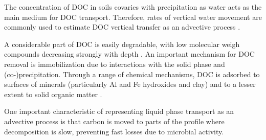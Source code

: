 \documentclass[11pt, oneside, a4paper]{article}   	%
\begin{document}
The concentration of DOC in soils covaries with precipitation \citep{Liu2021} as water acts as the main medium for DOC transport. Therefore, rates of vertical water movement are commonly used to estimate DOC vertical transfer as an advective process \citep{Ota2013}. 

A considerable part of DOC is easily degradable, with low molecular weigh compounds decreasing strongly with depth \citep{Roth2019}.  An important mechanism for DOC removal
is immobilization due to interactions with the solid phase and (co-)precipitation.
Through a range of chemical mechanisms, DOC is adsorbed to surfaces of minerals (particularly Al and Fe hydroxides and clay) and to a lesser extent to solid organic
matter \citep{Neff2001, Kalbitz2008}.

One important characteristic of representing liquid phase transport as an advective process is that carbon is moved to parts of the profile where decomposition is slow, preventing fast losses due to microbial activity. 



\end{document}
